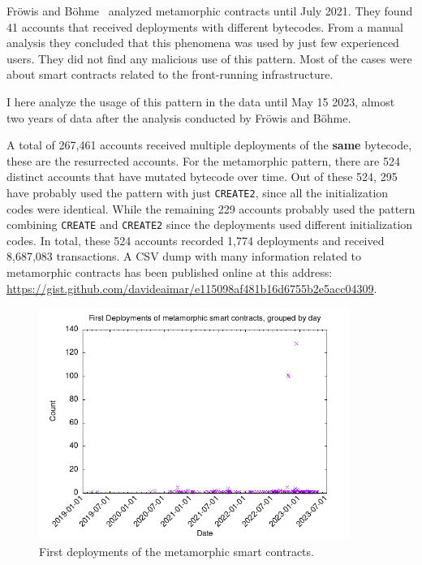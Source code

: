 Fröwis and Böhme~\cite{create2-metamorphic} analyzed metamorphic contracts until July 2021. They found 41 accounts that received deployments with different bytecodes. From a manual analysis they concluded that this phenomena was used by just few experienced users. They did not find any malicious use of this pattern. Most of the cases were about smart contracts related to the front-running infrastructure.

I here analyze the usage of this pattern in the data until May 15 2023, almost two years of data after the analysis conducted by Fröwis and Böhme.

A total of 267,461 accounts received multiple deployments of the \textbf{same} bytecode, these are the resurrected accounts. For the metamorphic pattern, there are 524 distinct accounts that have mutated bytecode over time. Out of these 524, 295 have probably used the pattern with just {\tt CREATE2}, since all the initialization codes were identical. While the remaining 229 accounts probably used the pattern combining {\tt CREATE} and {\tt CREATE2} since the deployments used different initialization codes. In total, these 524 accounts recorded 1,774 deployments and received 8,687,083 transactions. A CSV dump with many information related to metamorphic contracts has been published online at this address: \url{https://gist.github.com/davideaimar/e115098af481b16d6755b2e5acc04309}.

\begin{figure}
    \centering
    \includegraphics[width=0.9\textwidth]{Figures/analysis/metamorphic-first_deploys_outliers.png}
    \caption{First deployments of the metamorphic smart contracts.}
    \label{fig:meta-deploys-1}
\end{figure}

